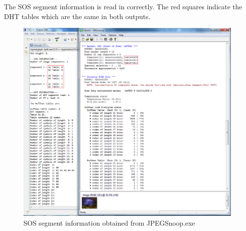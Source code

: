 The SOS segment information is read in correctly. The red squares indicate
the DHT tables which are the same in both outputs.

\begin{figure}[!hbtp]
\begin{center}
\includegraphics[scale=0.5]{figures/jpegSOStest.png} 
\end{center}
\caption{SOS segment information obtained from JPEGSnoop.exe}
\end{figure}